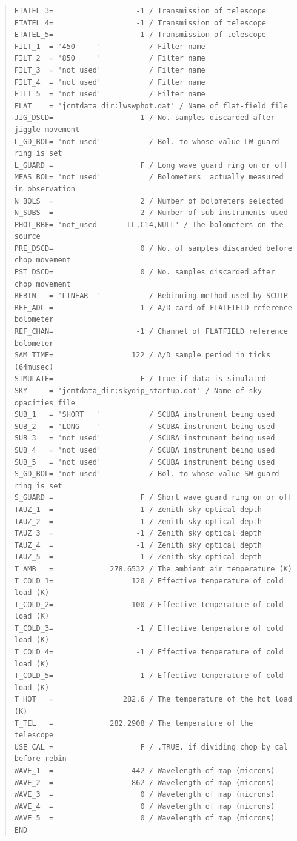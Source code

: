 \documentclass[twoside,11pt]{article}
\newenvironment{myquote}{\begin{quote}\begin{small}}{\end{small}\end{quote}}
\renewcommand{\_}{\texttt{\symbol{95}}}
\begin{document}
\begin{myquote}
\begin{verbatim}
ETATEL_3=                   -1 / Transmission of telescope
ETATEL_4=                   -1 / Transmission of telescope
ETATEL_5=                   -1 / Transmission of telescope
FILT_1  = '450     '           / Filter name
FILT_2  = '850     '           / Filter name
FILT_3  = 'not used'           / Filter name
FILT_4  = 'not used'           / Filter name
FILT_5  = 'not used'           / Filter name
FLAT    = 'jcmtdata_dir:lwswphot.dat' / Name of flat-field file
JIG_DSCD=                   -1 / No. samples discarded after jiggle movement
L_GD_BOL= 'not used'           / Bol. to whose value LW guard ring is set
L_GUARD =                    F / Long wave guard ring on or off
MEAS_BOL= 'not used'           / Bolometers  actually measured in observation
N_BOLS  =                    2 / Number of bolometers selected
N_SUBS  =                    2 / Number of sub-instruments used
PHOT_BBF= 'not_used       LL,C14,NULL' / The bolometers on the source
PRE_DSCD=                    0 / No. of samples discarded before chop movement
PST_DSCD=                    0 / No. samples discarded after chop movement
REBIN   = 'LINEAR  '           / Rebinning method used by SCUIP
REF_ADC =                   -1 / A/D card of FLATFIELD reference bolometer
REF_CHAN=                   -1 / Channel of FLATFIELD reference bolometer
SAM_TIME=                  122 / A/D sample period in ticks (64musec)
SIMULATE=                    F / True if data is simulated
SKY     = 'jcmtdata_dir:skydip_startup.dat' / Name of sky opacities file
SUB_1   = 'SHORT   '           / SCUBA instrument being used
SUB_2   = 'LONG    '           / SCUBA instrument being used
SUB_3   = 'not used'           / SCUBA instrument being used
SUB_4   = 'not used'           / SCUBA instrument being used
SUB_5   = 'not used'           / SCUBA instrument being used
S_GD_BOL= 'not used'           / Bol. to whose value SW guard ring is set
S_GUARD =                    F / Short wave guard ring on or off
TAUZ_1  =                   -1 / Zenith sky optical depth
TAUZ_2  =                   -1 / Zenith sky optical depth
TAUZ_3  =                   -1 / Zenith sky optical depth
TAUZ_4  =                   -1 / Zenith sky optical depth
TAUZ_5  =                   -1 / Zenith sky optical depth
T_AMB   =             278.6532 / The ambient air temperature (K)
T_COLD_1=                  120 / Effective temperature of cold load (K)
T_COLD_2=                  100 / Effective temperature of cold load (K)
T_COLD_3=                   -1 / Effective temperature of cold load (K)
T_COLD_4=                   -1 / Effective temperature of cold load (K)
T_COLD_5=                   -1 / Effective temperature of cold load (K)
T_HOT   =                282.6 / The temperature of the hot load (K)
T_TEL   =             282.2908 / The temperature of the telescope
USE_CAL =                    F / .TRUE. if dividing chop by cal before rebin
WAVE_1  =                  442 / Wavelength of map (microns)
WAVE_2  =                  862 / Wavelength of map (microns)
WAVE_3  =                    0 / Wavelength of map (microns)
WAVE_4  =                    0 / Wavelength of map (microns)
WAVE_5  =                    0 / Wavelength of map (microns)
END
\end{verbatim}
\end{myquote}
\end{document}
